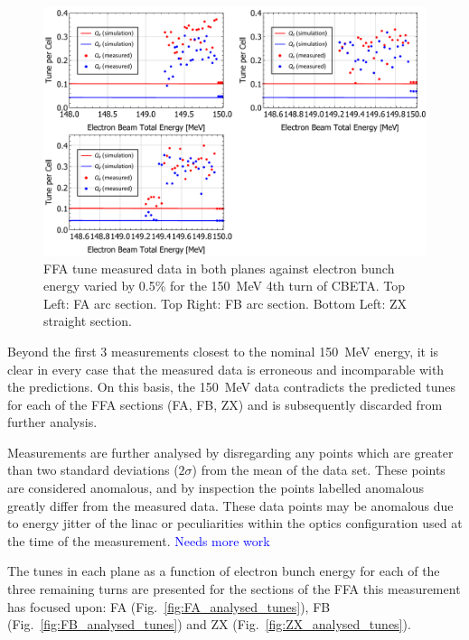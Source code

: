 \documentclass[../main.tex]{subfiles}
\begin{document}
\begin{figure}[!h]
\centering
\includegraphics[width=\textwidth]{Figures/CBETA_Multi-Pass_Commissioning/chromaticity/FAFBZX_150_tunes.pdf}
\caption{FFA tune measured data in both planes against electron bunch energy varied by 0.5\% for the 150~\si{\mega\electronvolt} 4th turn of CBETA. Top Left: FA arc section. Top Right: FB arc section. Bottom Left: ZX straight section.}
\label{fig:FAFBZX_150MeV_tunes}
\end{figure}

Beyond the first 3 measurements closest to the nominal 150~\si{\mega\electronvolt} energy, it is clear in every case that the measured data is erroneous and incomparable with the predictions. On this basis, the 150~\si{\mega\electronvolt} data contradicts the predicted tunes for each of the FFA sections (FA, FB, ZX) and is subsequently discarded from further analysis.

Measurements are further analysed by disregarding any points which are greater than two standard deviations ($2\sigma$) from the mean of the data set. These points are considered anomalous, and by inspection the points labelled anomalous greatly differ from the measured data. These data points may be anomalous due to energy jitter of the linac or peculiarities within the optics configuration used at the time of the measurement. \textcolor{blue}{Needs more work}

The tunes in each plane as a function of electron bunch energy for each of the three remaining turns are presented for the sections of the FFA this measurement has focused upon: FA (Fig.~\ref{fig:FA_analysed_tunes}), FB (Fig.~\ref{fig:FB_analysed_tunes}) and ZX (Fig.~\ref{fig:ZX_analysed_tunes}).
\end{document}
